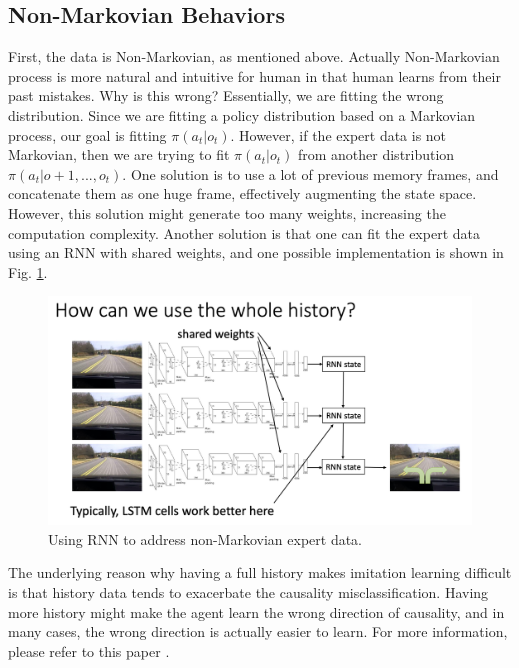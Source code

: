 \subsection{Non-Markovian Behaviors}
First, the data is Non-Markovian, as mentioned above. Actually Non-Markovian process is more natural and intuitive for human in that human learns from their past mistakes. Why is this wrong? Essentially, we are fitting the wrong distribution. Since we are fitting a policy distribution based on a Markovian process, our goal is fitting $\pi(a_t|o_t)$. However, if the expert data is not Markovian, then we are trying to fit $\pi(a_t|o_t)$ from another distribution $\pi(a_t|o+1,...,o_t)$. One solution is to use a lot of previous memory frames, and concatenate them as one huge frame, effectively augmenting the state space. However, this solution might generate too many weights, increasing the computation complexity. Another solution is that one can fit the expert data using an RNN with shared weights, and one possible implementation is shown in Fig. \ref{fig:im_RNN}.
\begin{figure}
    \centering
    \includegraphics[scale = 0.4]{figures/im_RNN.png}
    \caption{Using RNN to address non-Markovian expert data.}
    \label{fig:im_RNN}
\end{figure}
The underlying reason why having a full history makes imitation learning difficult is that history data tends to exacerbate the causality misclassification. Having more history might make the agent learn the wrong direction of causality, and in many cases, the wrong direction is actually easier to learn. For more information, please refer to this paper \cite{de2019causal}.
